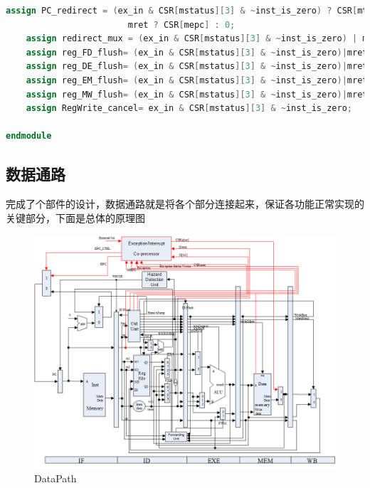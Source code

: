 \begin{lstlisting}[language = {verilog}]
	assign PC_redirect = (ex_in & CSR[mstatus][3] & ~inst_is_zero) ? CSR[mtvec] :
						mret ? CSR[mepc] : 0;
	assign redirect_mux = (ex_in & CSR[mstatus][3] & ~inst_is_zero) | mret;
	assign reg_FD_flush= (ex_in & CSR[mstatus][3] & ~inst_is_zero)|mret;
	assign reg_DE_flush= (ex_in & CSR[mstatus][3] & ~inst_is_zero)|mret;
	assign reg_EM_flush= (ex_in & CSR[mstatus][3] & ~inst_is_zero)|mret; 
	assign reg_MW_flush= (ex_in & CSR[mstatus][3] & ~inst_is_zero)|mret; 
	assign RegWrite_cancel= ex_in & CSR[mstatus][3] & ~inst_is_zero;

endmodule
\end{lstlisting}

\subsection{数据通路}
完成了个部件的设计，数据通路就是将各个部分连接起来，保证各功能正常实现的关键部分，下面是总体的原理图

\begin{figure}[H] %
    \centering %
    \includegraphics[width=1.0\textwidth]{figs/DataPath.png} %
    \caption{DataPath} %
    \label{Fig.10} %
\end{figure}


